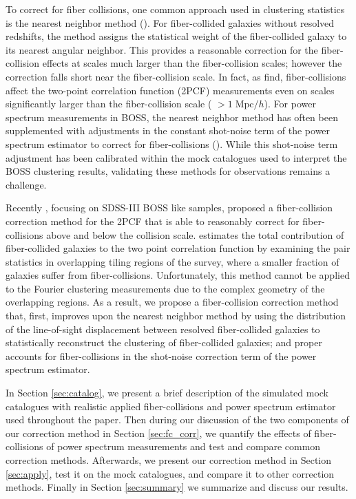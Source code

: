 \documentclass{emulateapj}
\begin{document}
To correct for fiber collisions, one common approach used in clustering statistics is the nearest neighbor method (\citealt{Zehavi:2002aa, Berlind:2006aa, Anderson:2012aa}). For fiber-collided galaxies without resolved redshifts, the method assigns the statistical weight of the fiber-collided galaxy to its nearest angular neighbor. This provides a reasonable correction for the fiber-collision effects at scales much larger than the fiber-collision scales; however the correction falls short near the fiber-collision scale. In fact, as \cite{Zehavi:2005aa} find, fiber-collisions affect the two-point correlation function (2PCF) measurements even on scales significantly larger than the fiber-collision scale ( $> 1\;\mathrm{Mpc}/h$). For power spectrum measurements in BOSS, the nearest neighbor method has often been supplemented with adjustments in the constant shot-noise term of the power spectrum estimator to correct for fiber-collisions (\citealt{Beutler:2014aa, Gil-Marin:2014aa}). While this shot-noise term adjustment has been calibrated within the mock catalogues used to interpret the BOSS clustering results, validating these methods for observations remains a challenge. 

Recently \cite{Guo:2012aa}, focusing on SDSS-III BOSS like samples, proposed a fiber-collision correction method for the 2PCF that is able to reasonably correct for fiber-collisions above and below the collision scale. \cite{Guo:2012aa} estimates the total contribution of fiber-collided galaxies to the two point correlation function by examining the pair statistics in overlapping tiling regions of the survey, where a smaller fraction of galaxies suffer from fiber-collisions. Unfortunately, this method cannot be applied to the Fourier clustering measurements due to the complex geometry of the overlapping regions. As a result, we propose a fiber-collision correction method that, first, improves upon the nearest neighbor method by using the distribution of the line-of-sight displacement between resolved fiber-collided galaxies to statistically reconstruct the clustering of fiber-collided galaxies; and proper accounts for fiber-collisions in the shot-noise correction term of the power spectrum estimator. 

In Section \ref{sec:catalog}, we present a brief description of the simulated mock catalogues with realistic applied fiber-collisions and power spectrum estimator used throughout the paper. Then during our discussion of the two components of our correction method in Section \ref{sec:fc_corr}, we quantify the effects of fiber-collisions of power spectrum measurements and test and compare common correction methods. Afterwards, we present our correction method in Section \ref{sec:apply}, test it on the mock catalogues, and compare it to other correction methods. Finally in Section \ref{sec:summary} we summarize and discuss our results. 
\end{document}
